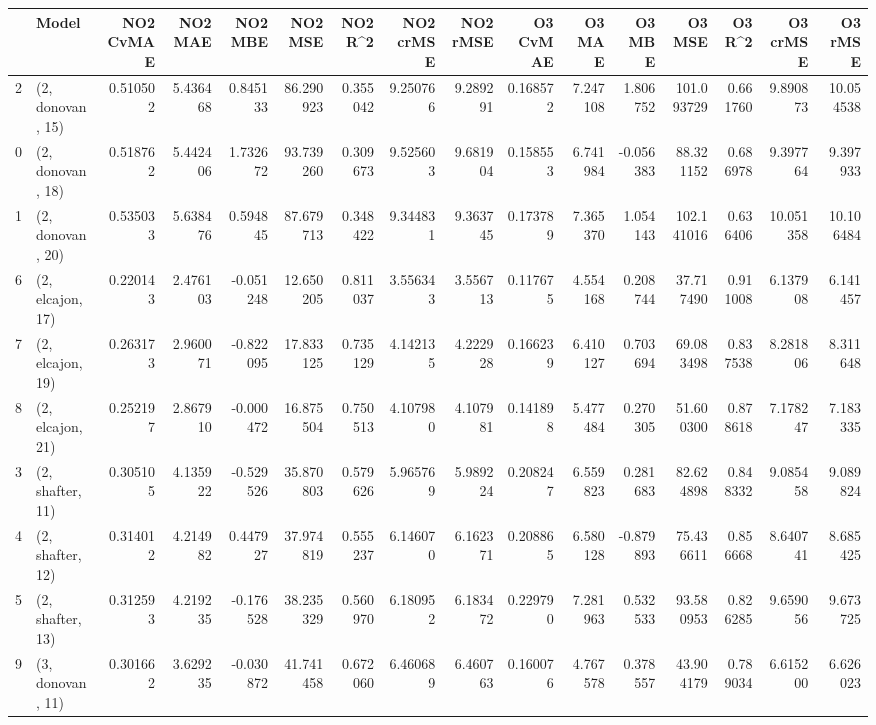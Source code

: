 \begin{tabular}{llrrrrrrrrrrrrrr}
\toprule
{} &             Model &  NO2 CvMAE &   NO2 MAE &   NO2 MBE &    NO2 MSE &   NO2 R\textasciicircum2 &  NO2 crMSE &  NO2 rMSE &  O3 CvMAE &     O3 MAE &    O3 MBE &      O3 MSE &    O3 R\textasciicircum2 &   O3 crMSE &    O3 rMSE \\
\midrule
2  &  (2, donovan, 15) &   0.510502 &  5.436468 &  0.845133 &  86.290923 &  0.355042 &   9.250766 &  9.289291 &  0.168572 &   7.247108 &  1.806752 &  101.093729 &  0.661760 &   9.890873 &  10.054538 \\
0  &  (2, donovan, 18) &   0.518762 &  5.442406 &  1.732672 &  93.739260 &  0.309673 &   9.525603 &  9.681904 &  0.158553 &   6.741984 & -0.056383 &   88.321152 &  0.686978 &   9.397764 &   9.397933 \\
1  &  (2, donovan, 20) &   0.535033 &  5.638476 &  0.594845 &  87.679713 &  0.348422 &   9.344831 &  9.363745 &  0.173789 &   7.365370 &  1.054143 &  102.141016 &  0.636406 &  10.051358 &  10.106484 \\
6  &  (2, elcajon, 17) &   0.220143 &  2.476103 & -0.051248 &  12.650205 &  0.811037 &   3.556343 &  3.556713 &  0.117675 &   4.554168 &  0.208744 &   37.717490 &  0.911008 &   6.137908 &   6.141457 \\
7  &  (2, elcajon, 19) &   0.263173 &  2.960071 & -0.822095 &  17.833125 &  0.735129 &   4.142135 &  4.222928 &  0.166239 &   6.410127 &  0.703694 &   69.083498 &  0.837538 &   8.281806 &   8.311648 \\
8  &  (2, elcajon, 21) &   0.252197 &  2.867910 & -0.000472 &  16.875504 &  0.750513 &   4.107980 &  4.107981 &  0.141898 &   5.477484 &  0.270305 &   51.600300 &  0.878618 &   7.178247 &   7.183335 \\
3  &  (2, shafter, 11) &   0.305105 &  4.135922 & -0.529526 &  35.870803 &  0.579626 &   5.965769 &  5.989224 &  0.208247 &   6.559823 &  0.281683 &   82.624898 &  0.848332 &   9.085458 &   9.089824 \\
4  &  (2, shafter, 12) &   0.314012 &  4.214982 &  0.447927 &  37.974819 &  0.555237 &   6.146070 &  6.162371 &  0.208865 &   6.580128 & -0.879893 &   75.436611 &  0.856668 &   8.640741 &   8.685425 \\
5  &  (2, shafter, 13) &   0.312593 &  4.219235 & -0.176528 &  38.235329 &  0.560970 &   6.180952 &  6.183472 &  0.229790 &   7.281963 &  0.532533 &   93.580953 &  0.826285 &   9.659056 &   9.673725 \\
9  &  (3, donovan, 11) &   0.301662 &  3.629235 & -0.030872 &  41.741458 &  0.672060 &   6.460689 &  6.460763 &  0.160076 &   4.767578 &  0.378557 &   43.904179 &  0.789034 &   6.615200 &   6.626023 \\

\end{tabular}
